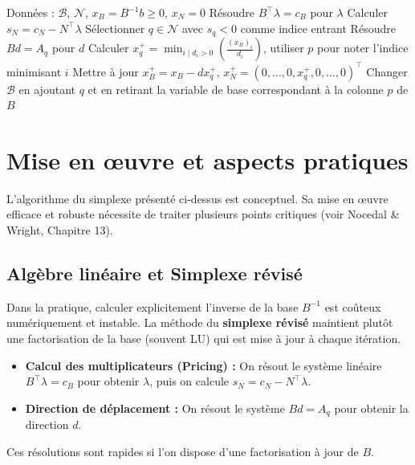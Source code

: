 \begin{algorithm}[H]
    \caption{Une étape de la méthode du Simplexe}
    \SetAlgoLined
    Données : $\mathcal{B}$, $\mathcal{N}$, $x_B=B^{-1}b\geq 0$, $x_N=0$\;
    Résoudre $B^\top\lambda = c_B$ pour $\lambda$\;
    Calculer $s_N=c_N - N^\top\lambda$\; 
    Sélectionner $q\in\mathcal{N}$ avec $s_q<0$ comme indice entrant\;
    Résoudre $Bd=A_q$ pour $d$\;
    Calculer $x_q^+=\min_{i \mid d_i> 0}\left(\frac{(x_B)_i}{d_i}\right)$, utiliser $p$ pour noter l'indice minimisant $i$\;
    Mettre à jour $x_B^+=x_B - d x_q^+$, $x_N^+=(0, \ldots, 0, x_q^+, 0, \ldots, 0)^\top$\;
    Changer $\mathcal{B}$ en ajoutant $q$ et en retirant la variable de base correspondant à la colonne $p$ de $B$\;
\end{algorithm}

\section{Mise en œuvre et aspects pratiques}

L'algorithme du simplexe présenté ci-dessus est conceptuel. Sa mise en œuvre efficace et robuste nécessite de traiter plusieurs points critiques (voir Nocedal \& Wright, Chapitre 13).

\subsection{Algèbre linéaire et Simplexe révisé}
Dans la pratique, calculer explicitement l'inverse de la base $B^{-1}$ est coûteux numériquement et instable. La méthode du \textbf{simplexe révisé} maintient plutôt une factorisation de la base (souvent LU) qui est mise à jour à chaque itération.
\begin{itemize}
    \item \textbf{Calcul des multiplicateurs (Pricing) :} On résout le système linéaire $B^\top \lambda = c_B$ pour obtenir $\lambda$, puis on calcule $s_N = c_N - N^\top \lambda$.
    \item \textbf{Direction de déplacement :} On résout le système $Bd = A_q$ pour obtenir la direction $d$.
\end{itemize}
Ces résolutions sont rapides si l'on dispose d'une factorisation à jour de $B$.

